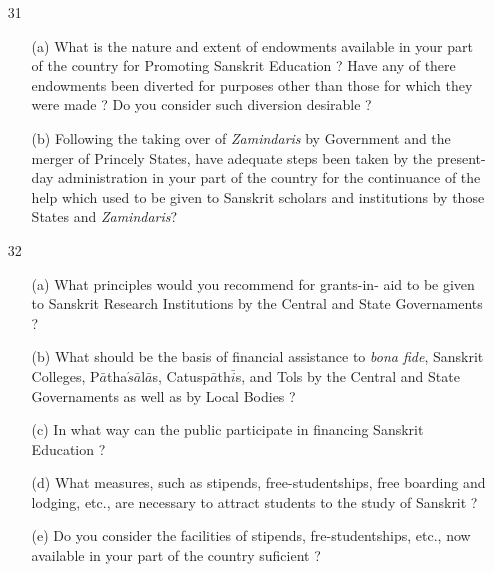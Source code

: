 {\rm 
\begin{itemize}
\item[31] \begin{itemize}
           
           \item[(a)] What is the nature and extent of endowments available in your part of the country for Promoting Sanskrit Education ? Have any of there endowments been diverted for purposes other than those for which they were made ? Do you consider such diversion desirable ? 
           
           \item[(b)] Following the taking over of {\textit {Zamindaris}} by Government and the merger of Princely States, have adequate steps been taken by the present-day administration in your part of the country for the continuance of the help which used to be given to Sanskrit scholars and institutions by those States and {\textit {Zamindaris}}?
           
          \end{itemize}
          
 \item[32] \begin{itemize}
            
            \item[(a)] What principles would you recommend for grants-in- aid to be given to Sanskrit Research Institutions by the Central and State Governaments ?
            
            \item[(b)] What should be the basis of financial assistance to {\textit {bona fide}}, Sanskrit Colleges, P$\bar{a}$tha$\acute{s}\bar{a}$l$\bar{a}$s, Catusp$\bar{a}$th$\bar{i}$s, and Tols by the Central and State Governaments as well as by Local Bodies ?
            
            \item[(c)] In what way can the public participate in financing Sanskrit Education ?
            
            \item[(d)] What measures, such as stipends, free-student\-ships, free boarding and lodging, etc., are necessary to attract students to the study of Sanskrit ? 
            
            \item[(e)] Do you consider the facilities of stipends, fre-studentships, etc., now available in your part of the country suficient ?
            

\end{itemize}
\end{itemize}}
